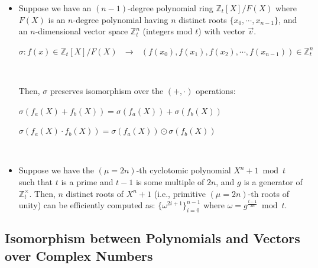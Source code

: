 \begin{tcolorbox}[title={\textbf{\tboxtheorem{\ref*{subsubsec:poly-vector-transformation-modulus}} Isomorphism between Polynomials and Vectors over Integers (Ring)}}]

\begin{itemize}
\item Suppose we have an $(n-1)$-degree polynomial ring $\mathbb{Z}_t[X] / F(X)$ where $F(X)$ is an $n$-degree polynomial having $n$ distinct roots $\{x_0, \cdots, x_{n-1}\}$, and an $n$-dimensional vector space $\mathbb{Z}_t^n$ (integers mod $t$) with vector $\vec{v}$.

$\sigma: f(x) \in \mathbb{Z}_t[X] / F(X) \text{ } \longrightarrow \text{ } (f(x_0), f(x_1), f(x_2), \cdots, f(x_{n-1})) \in \mathbb{Z}_t^n$

$ $

Then, $\sigma$ preserves isomorphism over the $(+, \cdot)$ operations:


$\sigma(f_a(X) + f_b(X)) = \sigma(f_a(X)) + \sigma(f_b(X))$

$\sigma(f_a(X) \cdot f_b(X)) = \sigma(f_a(X)) \odot \sigma(f_b(X))$

$ $




\item Suppose we have the $(\mu=2n)$-th cyclotomic polynomial $X^n + 1 \bmod t$ such that $t$ is a prime and $t - 1$ is some multiple of $2n$, and $g$ is a generator of $\mathbb{Z}_t^{\times}$. Then, $n$ distinct roots of $X^n + 1$ (i.e., primitive $(\mu=2n)$-th roots of unity) can be efficiently computed as: $\{\omega^{2i + 1}\}_{i=0}^{n-1}$ where $\omega = g^{\frac{t-1}{2n}} \bmod t$. 


\end{itemize}
\end{tcolorbox}





\subsection{Isomorphism between Polynomials and Vectors over Complex Numbers}
\label{subsec:poly-vector-transformation-complex}



